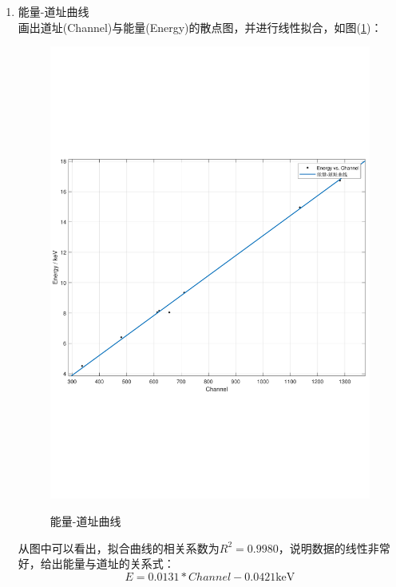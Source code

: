 \documentclass[a4paper]{article}
\begin{document}
\begin{enumerate}
\item 能量-道址曲线\\
画出道址(Channel)与能量(Energy)的散点图，并进行线性拟合，如图(\ref{E-Channel})：
\begin{figure}[!h]
\centering
\includegraphics[width=12cm]{fig/E_C.pdf}\\
\caption{能量-道址曲线}\label{E-Channel}
\end{figure}
从图中可以看出，拟合曲线的相关系数为$R^2 = 0.9980$，说明数据的线性非常好，给出能量与道址的关系式：
\begin{equation}
E = 0.0131*Channel-0.0421 \text{keV}\label{E-Channel_Eqn}
\end{equation}


\end{enumerate}
\end{document}
